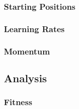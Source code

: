 \documentclass{scrartcl}
\begin{document}
\subsubsection{Starting Positions}
\subsubsection{Learning Rates}
\subsubsection{Momentum}

\subsection{Analysis}

\subsubsection{Fitness}
\end{document}
